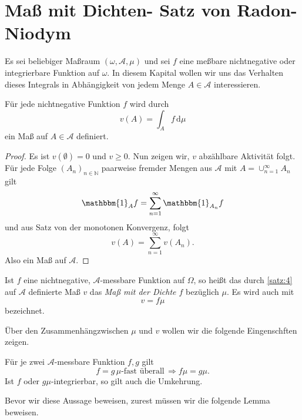 \documentclass[/Users/zhangwusheng/Documents/satz von radon nikodym/satz von radon nikodym.tex]{subfiles}
\begin{document}
\section{Maß mit Dichten- Satz von Radon-Niodym}
    Es sei beliebiger Maßraum $(\omega, \mathcal{A}, \mu)$ und sei $f$ eine meßbare nichtnegative oder integrierbare Funktion
    auf $\omega$. 
    In diesem Kapital wollen wir uns das Verhalten dieses Integrals in Abhängigkeit von jedem Menge $A \in \mathcal{A}$ interessieren.

    \begin{theorem}\label{satz:4}
        Für jede nichtnegative Funktion $f$ wird durch 
        \[v(A) = \int_A f\,\mathrm{d}\mu\]
        ein Maß auf $A \in \mathcal{A}$ definiert.
    \end{theorem}

    \begin{proof}
        Es ist $v(\emptyset)=0$ und $v \geq 0$. Nun zeigen wir, $v$ abzählbare Aktivität folgt. Für jede Folge $(A_{n})_{n \in \mathbb{N}}$ 
        paarweise fremder Mengen aus $\mathcal{A}$ mit 
        $A = \cup_{n=1}^\infty A_{n}$ gilt 
        \[\mathbbm{1}_{A} f = \sum_{n=1}^\infty \mathbbm{1}_{A_n} f\]
        und aus Satz von der monotonen Konvergenz, folgt 
        \[v(A) = \sum_{n=1}^\infty v(A_n).\]
        Also ein Maß auf $\mathcal{A}$. 
    \end{proof}

    \begin{mdframed}[style=mdfexample]
        \begin{definition}
            Ist $f$ eine nichtnegative, $\mathcal{A}$-messbare Funktion auf $\Omega$, so heißt das durch \cref{satz:4} auf $\mathcal{A}$ 
            definierte Maß $v$ das \textit{Maß mit der Dichte $f$} bezüglich $\mu$. Es wird auch mit 
            \[v = f\mu\]
            bezeichnet.
        \end{definition}
    \end{mdframed}
    Über den Zusammenhängzwischen $\mu$ und $v$ wollen wir die folgende Eingenschften zeigen.

    \begin{theorem}\label{satz:5}
        Für je zwei $\mathcal{A}$-messbare Funktion $f, g$ gilt 
        \[f = g\, \text{$\mu$-fast überall}\, \Longrightarrow f\mu = g\mu.\]
        Ist $f$ oder $g \mu$-integrierbar, so gilt auch die Umkehrung.
    \end{theorem}

    Bevor wir diese Aussage beweisen, zurest müssen wir die folgende Lemma beweisen.
    
\end{document}
